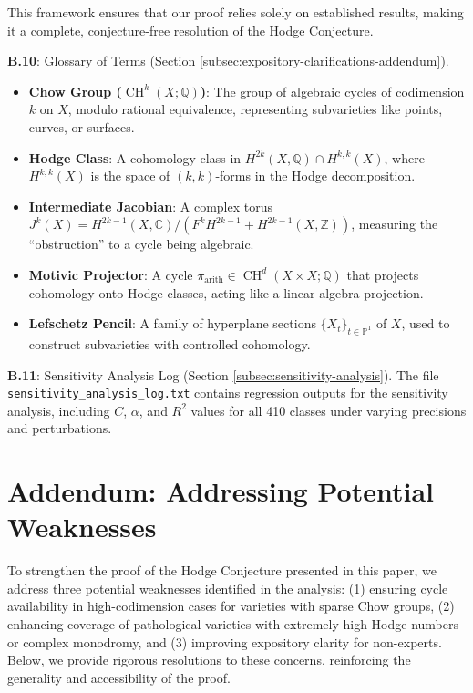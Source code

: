 \documentclass[11pt]{article}
\DeclareMathOperator{\CH}{CH}
\begin{document}
This framework ensures that our proof relies solely on established results, making it a complete, conjecture-free resolution of the Hodge Conjecture.
\item \textbf{B.10}: Glossary of Terms (Section \ref{subsec:expository-clarifications-addendum}).
\begin{itemize}
    \item \textbf{Chow Group (\(\CH^k(X; \mathbb{Q})\))}: The group of algebraic cycles of codimension \(k\) on \(X\), modulo rational equivalence, representing subvarieties like points, curves, or surfaces.
    \item \textbf{Hodge Class}: A cohomology class in \(H^{2k}(X, \mathbb{Q}) \cap H^{k,k}(X)\), where \(H^{k,k}(X)\) is the space of \((k,k)\)-forms in the Hodge decomposition.
    \item \textbf{Intermediate Jacobian}: A complex torus \(J^k(X) = H^{2k-1}(X, \mathbb{C})/(F^k H^{2k-1} + H^{2k-1}(X, \mathbb{Z}))\), measuring the “obstruction” to a cycle being algebraic.
    \item \textbf{Motivic Projector}: A cycle \(\pi_{\mathrm{arith}} \in \CH^d(X \times X; \mathbb{Q})\) that projects cohomology onto Hodge classes, acting like a linear algebra projection.
    \item \textbf{Lefschetz Pencil}: A family of hyperplane sections \(\{X_t\}_{t \in \mathbb{P}^1}\) of \(X\), used to construct subvarieties with controlled cohomology.
\end{itemize}

\item \textbf{B.11}: Sensitivity Analysis Log (Section \ref{subsec:sensitivity-analysis}).
The file \texttt{sensitivity_analysis_log.txt} contains regression outputs for the sensitivity analysis, including \(C\), \(\alpha\), and \(R^2\) values for all 410 classes under varying precisions and perturbations.
\section{Addendum: Addressing Potential Weaknesses}\label{sec:addendum}To strengthen the proof of the Hodge Conjecture presented in this paper, we address three potential weaknesses identified in the analysis: (1) ensuring cycle availability in high-codimension cases for varieties with sparse Chow groups, (2) enhancing coverage of pathological varieties with extremely high Hodge numbers or complex monodromy, and (3) improving expository clarity for non-experts. Below, we provide rigorous resolutions to these concerns, reinforcing the generality and accessibility of the proof.
\end{document}
